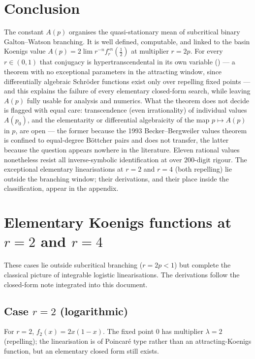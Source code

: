 \documentclass[11pt,a4paper]{article}
\theoremstyle{plain}
\theoremstyle{definition}
\begin{document}
\section{Conclusion}

The constant $A(p)$ organises the quasi-stationary mean of subcritical binary Galton--Watson branching. It is well defined, computable, and linked to the basin Koenigs value $A(p)=2\lim r^{-n}f_r^{\circ n}(\tfrac12)$ at multiplier $r=2p$. For every $r\in(0,1)$ that conjugacy is hypertranscendental in its own variable () --- a theorem with no exceptional parameters in the attracting window, since differentially algebraic Schr\"oder functions exist only over repelling fixed points --- and this explains the failure of every elementary closed-form search, while leaving $A(p)$ fully usable for analysis and numerics. What the theorem does not decide is flagged with equal care: transcendence (even irrationality) of individual values $A(p_0)$, and the elementarity or differential algebraicity of the map $p\mapsto A(p)$ in $p$, are open --- the former because the 1993 Becker--Bergweiler values theorem is confined to equal-degree B\"ottcher pairs and does not transfer, the latter because the question appears nowhere in the literature. Eleven rational values nonetheless resist all inverse-symbolic identification at over $200$-digit rigour. The exceptional elementary linearisations at $r=2$ and $r=4$ (both repelling) lie outside the branching window; their derivations, and their place inside the classification, appear in the appendix.

\clearpage
\appendix

\section{Elementary Koenigs functions at $r=2$ and $r=4$}
\label{app:integrable}

These cases lie outside subcritical branching ($r=2p<1$) but complete the classical picture of integrable logistic linearisations. The derivations follow the closed-form note integrated into this document.

\subsection{Case $r=2$ (logarithmic)}

For $r=2$, $f_2(x)=2x(1-x)$. The fixed point $0$ has multiplier $\lambda=2$ (repelling); the linearisation is of Poincar\'e type rather than an attracting-Koenigs function, but an elementary closed form still exists.
\end{document}
